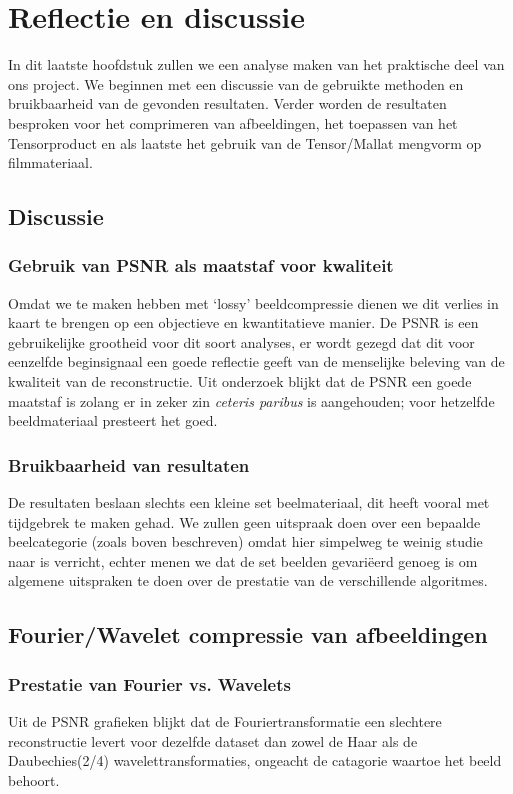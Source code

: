 \chapter{Reflectie en discussie}
In dit laatste hoofdstuk zullen we een analyse maken van het praktische deel van ons project.
We beginnen met een discussie van de gebruikte methoden en bruikbaarheid van de gevonden resultaten.
Verder worden de resultaten besproken voor het comprimeren van afbeeldingen, het toepassen van het 
Tensorproduct en als laatste het gebruik van de Tensor/Mallat mengvorm op filmmateriaal. 

\section{Discussie}
\subsection{Gebruik van PSNR als maatstaf voor kwaliteit}
Omdat we te maken hebben met `lossy' beeldcompressie dienen we dit verlies in kaart te brengen op een 
objectieve en kwantitatieve manier. 
De PSNR is een gebruikelijke grootheid voor dit soort analyses, er wordt gezegd dat dit voor eenzelfde 
beginsignaal een goede reflectie geeft van de menselijke beleving van de kwaliteit van de reconstructie.
Uit onderzoek\cite{PSNR} blijkt dat de PSNR een goede maatstaf is zolang er in zeker zin \emph{ceteris paribus}
is aangehouden; voor hetzelfde beeldmateriaal presteert het goed.

\subsection{Bruikbaarheid van resultaten}

De resultaten beslaan slechts een kleine set beelmateriaal, dit heeft vooral met tijdgebrek te maken gehad.
We zullen geen uitspraak doen over een bepaalde beelcategorie (zoals boven beschreven) omdat hier simpelweg te
weinig studie naar is verricht, echter menen we dat de set beelden gevari\"eerd genoeg is om algemene uitspraken te doen
over de prestatie van de verschillende algoritmes.

\section{Fourier/Wavelet compressie van afbeeldingen}

\subsection{Prestatie van Fourier vs. Wavelets}
Uit de PSNR grafieken blijkt dat de Fouriertransformatie een slechtere reconstructie levert voor dezelfde dataset
dan zowel de Haar als de Daubechies(2/4) wavelettransformaties, ongeacht de catagorie waartoe het beeld behoort.

